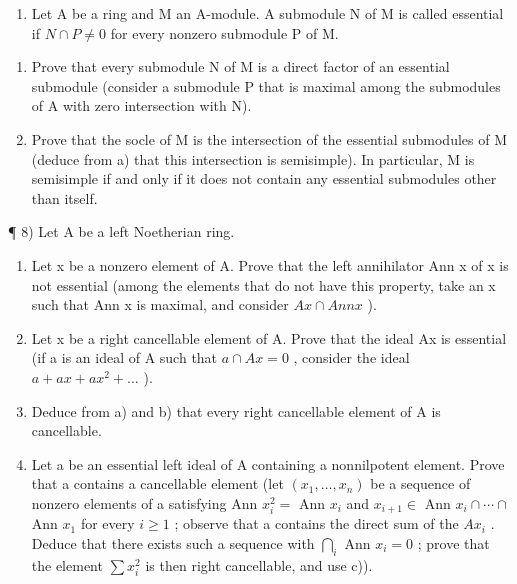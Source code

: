 \begin{enumerate}
\def\labelenumi{\arabic{enumi})}
\setcounter{enumi}{6}
\tightlist
\item
  Let A be a ring and M an A-module. A submodule N of M is called essential if \(N \cap P \neq 0\) for every nonzero submodule P of M.
\end{enumerate}

\begin{enumerate}
\def\labelenumi{\alph{enumi})}
\item
  Prove that every submodule N of M is a direct factor of an essential submodule (consider a submodule P that is maximal among the submodules of A with zero intersection with N).
\item
  Prove that the socle of M is the intersection of the essential submodules of M (deduce from a) that this intersection is semisimple). In particular, M is semisimple if and only if it does not contain any essential submodules other than itself.
\end{enumerate}

¶ 8) Let A be a left Noetherian ring.

\begin{enumerate}
\def\labelenumi{\alph{enumi})}
\item
  Let x be a nonzero element of A. Prove that the left annihilator Ann x of x is not essential (among the elements that do not have this property, take an x such that Ann x is maximal, and consider \(Ax \cap Ann x\) ).
\item
  Let x be a right cancellable element of A. Prove that the ideal Ax is essential (if a is an ideal of A such that \(a \cap Ax = 0\) , consider the ideal \(a + ax + ax^{2} + \ldots\) ).
\item
  Deduce from a) and b) that every right cancellable element of A is cancellable.
\item
  Let a be an essential left ideal of A containing a nonnilpotent element. Prove that a contains a cancellable element (let \((x_{1},\ldots,x_{n})\) be a sequence of nonzero elements of a satisfying Ann \(x_{i}^{2}=\) Ann \(x_{i}\) and \(x_{i+1}\in\) Ann \(x_{i}\cap\cdots\cap\) Ann \(x_{1}\) for every \(i\geqslant1\) ; observe that a contains the direct sum of the \(Ax_{i}\) . Deduce that there exists such a sequence with \(\bigcap_{i}\) Ann \(x_{i}=0\) ; prove that the element \(\sum x_{i}^{2}\) is then right cancellable, and use c)).
\end{enumerate}

